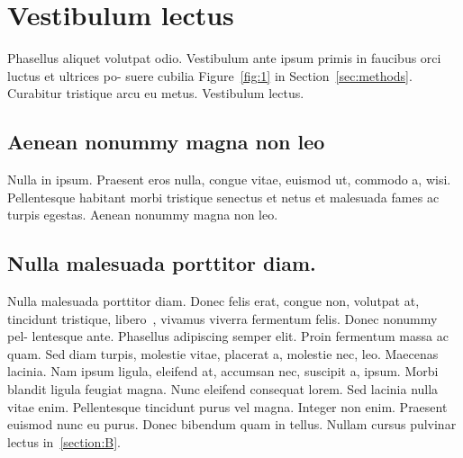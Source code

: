 \documentclass[preprint,3p,times,twocolumn]{elsarticle}  %
\begin{document}
\section{Vestibulum lectus}\label{sec:implementation}\label{section:results}
Phasellus aliquet volutpat odio. Vestibulum ante ipsum primis in faucibus 
orci luctus et ultrices po- suere cubilia
Figure~\ref{fig:1} in Section~\ref{sec:methods}.
Curabitur tristique arcu eu metus.  Vestibulum lectus. 

\subsection{Aenean nonummy magna non leo}
Nulla in ipsum. Praesent eros nulla, congue vitae,
euismod ut, commodo a, wisi.~\citep{probst19} Pellentesque habitant
morbi tristique senectus et netus et malesuada fames ac
turpis egestas. Aenean nonummy magna non leo.

\subsection{Nulla malesuada porttitor diam.}
Nulla malesuada porttitor diam. Donec felis erat, congue non, volutpat at,
 tincidunt tristique, libero~\citep{chang18}, vivamus viverra fermentum felis. Donec nonummy 
pel- lentesque ante. Phasellus adipiscing semper elit. Proin fermentum massa 
ac quam. Sed diam turpis, molestie vitae, placerat a, molestie nec, leo.
 Maecenas lacinia.  Nam ipsum ligula, eleifend at, accumsan nec, suscipit 
a, ipsum. Morbi blandit ligula feugiat magna. Nunc eleifend consequat lorem.
 Sed lacinia nulla vitae enim.  Pellentesque tincidunt purus vel magna. 
Integer non enim. Praesent euismod nunc eu purus. Donec bibendum quam in 
tellus. Nullam cursus pulvinar lectus in~\ref{section:B}.  
\end{document}

